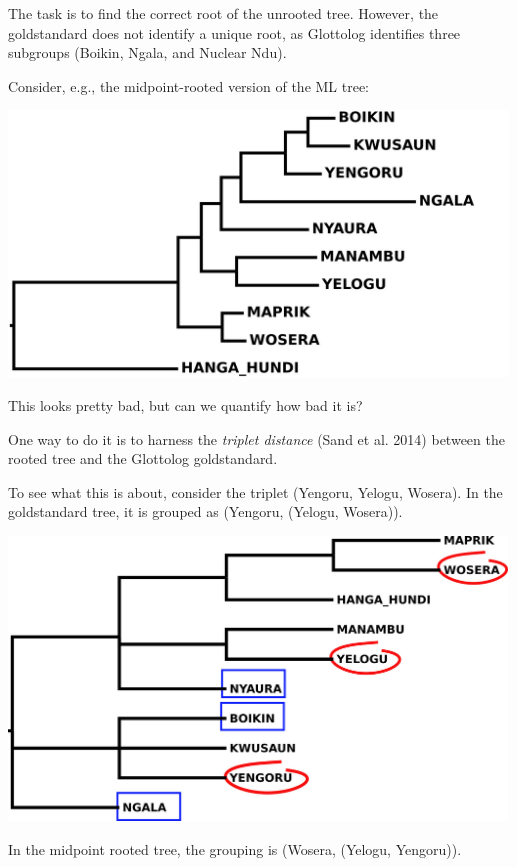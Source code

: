 \documentclass[
  a4paper,
  14pt,
  oneside,
  tablecaptionabove
]{scrbook}
\begin{document}
{The task is to find the correct root of the unrooted tree. However, the
goldstandard does not identify a unique root, as Glottolog identifies
three subgroups (Boikin, Ngala, and Nuclear Ndu).}

{Consider, e.g., the midpoint-rooted version of the ML tree:}

{\includegraphics[width=5.21875in,height=2.78125in]{images/Ndu.midpointRooted.jpg}}

{This looks pretty bad, but can we quantify how bad it is?}

{One way to do it is to harness the \emph{triplet distance} (Sand et al.
2014) between the rooted tree and the Glottolog goldstandard.}

{To see what this is about, consider the triplet (Yengoru, Yelogu,
Wosera). In the goldstandard tree, it is grouped as (Yengoru, (Yelogu,
Wosera)).}

{\includegraphics[width=5.20833in,height=2.96875in]{images//Ndu.glot_triplets.jpg}}

{In the midpoint rooted tree, the grouping is (Wosera, (Yelogu,
Yengoru)).}
\end{document}
